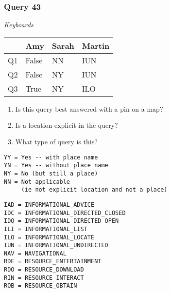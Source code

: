 \begin{frame}[fragile]
\frametitle{Query 43}
\vspace{1em}

\emph{Keyboards}

\vfill

\begin{table}
  \centering
  \begin{tabular}{ l l l l }
    & \textbf{Amy} & \textbf{Sarah} & \textbf{Martin}\\
    \toprule
    Q1 & False & NN & IUN\\
Q2 & False & NY & IUN\\
Q3 & True & NY & ILO\\
    \bottomrule
  \end{tabular}
\end{table}

\vfill

\tiny{

\begin{enumerate}
\item Is this query best answered with a pin on a map?
\item Is a location explicit in the query?
\item What type of query is this?
\end{enumerate}

\vfill

\begin{multicols}{2}
\begin{verbatim}
YY = Yes -- with place name
YN = Yes -- without place name
NY = No (but still a place)
NN = Not applicable 
     (ie not explicit location and not a place)
\end{verbatim}

\columnbreak
\begin{verbatim}
IAD = INFORMATIONAL_ADVICE
IDC = INFORMATIONAL_DIRECTED_CLOSED
IDO = INFORMATIONAL_DIRECTED_OPEN
ILI = INFORMATIONAL_LIST
ILO = INFORMATIONAL_LOCATE
IUN = INFORMATIONAL_UNDIRECTED
NAV = NAVIGATIONAL
RDE = RESOURCE_ENTERTAINMENT
RDO = RESOURCE_DOWNLOAD
RIN = RESOURCE_INTERACT
ROB = RESOURCE_OBTAIN
\end{verbatim}
\end{multicols}
}

\end{frame}


